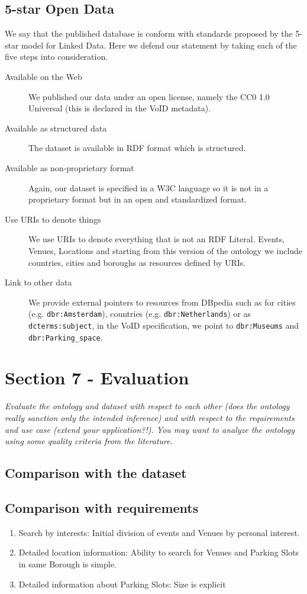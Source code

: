 \documentclass[runningheads,a4paper]{../../StyleFiles/llncs}
\begin{document}
\subsection{5-star Open Data}
We say that the published database is conform with standards proposed by the
5-star model for Linked Data. Here we defend our statement by taking each of the
five steps into consideration.

\begin{description}
\item[Available on the Web] We published our data under an open license,
namely the CC0 1.0 Universal (this is declared in the VoID metadata).
\item[Available as structured data] The dataset is available in RDF
format which is structured.
\item[Available as non-proprietary format] Again, our dataset is specified
in a W3C language so it is not in a proprietary format but in an
open and standardized format.
\item[Use URIs to denote things] We use URIs to denote everything that is
not an RDF Literal. Events, Venues, Locations and starting from this version of
the ontology we include countries, cities and boroughs as resources defined by
URIs.
\item[Link to other data] We provide external pointers to resources from
DBpedia such as for cities (e.g. \texttt{dbr:Amsterdam}), countries (e.g.
\texttt{dbr:Netherlands}) or as \texttt{dcterms:subject}, in the VoID
specification, we point to \texttt{dbr:Museums} and \texttt{dbr:Parking\_space}.
\end{description}


\section{Section 7 - Evaluation}
\textit{Evaluate the ontology and dataset with respect to each other (does the ontology really sanction only the intended inference) and with respect to the requirements and use case (extend your application?!). You may want to analyze the ontology using some quality criteria from the literature.}

\subsection{Comparison with the dataset}

\subsection{Comparison with requirements}
\begin{enumerate}
	\item Search by interests: Initial division of events and Venues by personal interest.
	\item Detailed location information: Ability to search for Venues and Parking Slots in same Borough is simple.
	\item Detailed information about Parking Slots: Size is explicit
\end{enumerate}
\end{document}
